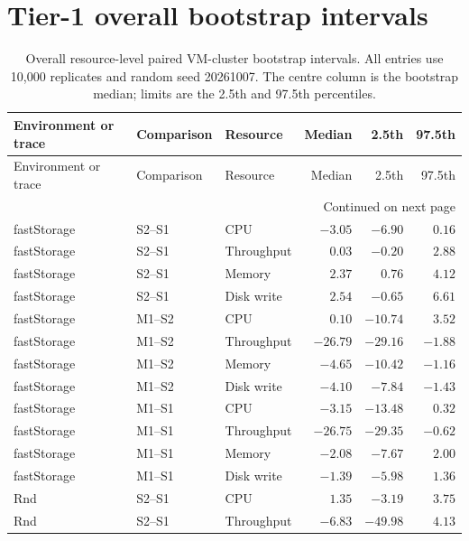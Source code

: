\documentclass[a4paper,11pt]{article}
\begin{document}
\section*{Tier-1 overall bootstrap intervals}
\small
\begin{longtable}{@{}lllrrr@{}}
  \caption{Overall resource-level paired VM-cluster bootstrap intervals. All
  entries use 10,000 replicates and random seed 20261007. The centre column is
  the bootstrap median; limits are the 2.5th and 97.5th percentiles.}
  \label{tab:overall-bootstrap-intervals}\\
  \toprule
  Environment or trace & Comparison & Resource & Median & 2.5th & 97.5th \\
  \midrule
  \endfirsthead
  \toprule
  Environment or trace & Comparison & Resource & Median & 2.5th & 97.5th \\
  \midrule
  \endhead
  \midrule
  \multicolumn{6}{r}{Continued on next page}\\
  \endfoot
  \bottomrule
  \endlastfoot
  fastStorage & S2--S1 & CPU & $-3.05$ & $-6.90$ & $ 0.16$ \\
  fastStorage & S2--S1 & Throughput & $ 0.03$ & $-0.20$ & $ 2.88$ \\
  fastStorage & S2--S1 & Memory & $ 2.37$ & $ 0.76$ & $ 4.12$ \\
  fastStorage & S2--S1 & Disk write & $ 2.54$ & $-0.65$ & $ 6.61$ \\
  fastStorage & M1--S2 & CPU & $ 0.10$ & $-10.74$ & $ 3.52$ \\
  fastStorage & M1--S2 & Throughput & $-26.79$ & $-29.16$ & $-1.88$ \\
  fastStorage & M1--S2 & Memory & $-4.65$ & $-10.42$ & $-1.16$ \\
  fastStorage & M1--S2 & Disk write & $-4.10$ & $-7.84$ & $-1.43$ \\
  fastStorage & M1--S1 & CPU & $-3.15$ & $-13.48$ & $ 0.32$ \\
  fastStorage & M1--S1 & Throughput & $-26.75$ & $-29.35$ & $-0.62$ \\
  fastStorage & M1--S1 & Memory & $-2.08$ & $-7.67$ & $ 2.00$ \\
  fastStorage & M1--S1 & Disk write & $-1.39$ & $-5.98$ & $ 1.36$ \\
  Rnd & S2--S1 & CPU & $ 1.35$ & $-3.19$ & $ 3.75$ \\
  Rnd & S2--S1 & Throughput & $-6.83$ & $-49.98$ & $ 4.13$ \\

\end{longtable}
\end{document}

